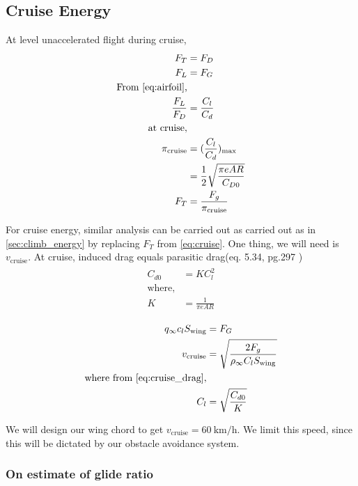 \subsection{Cruise Energy}
At level unaccelerated flight during cruise,
\begin{align}
    \label{eq:cruise}
    \begin{split}
        F_T &= F_D\\
        F_L &= F_G\\
        \text{From \eqref{eq:airfoil},}\\
        \frac{F_L}{F_D} &= \frac{C_l}{C_d}\\
        \text{at cruise},\\
        \pi_\text{cruise} &= (\frac{C_l}{C_d})_\text{max}\\
        &= \frac{1}{2}\sqrt{\frac{\pi e AR}{C_{D0}}}\\
        F_T &= \frac{F_g}{\pi_\text{cruise}}        
    \end{split}
\end{align}

For cruise energy, similar analysis can be carried out as carried out as in \ref{sec:climb_energy} by replacing $F_T$ from \eqref{eq:cruise}. One thing, we will need is $v_\text{cruise}$. At cruise, induced drag equals parasitic drag(eq. 5.34, pg.297 \cite{anderson2005introduction})
\begin{align}
    \begin{split}
        \label{eq:cruise_drag}
        C_{d0} &= K C_l^2 \\
        \text{where,}\\
        K &= \frac{1}{\pi e AR} \\    
    \end{split}
\end{align}
\begin{align*}
    q_\infty c_l S_\text{wing} &= F_G \\
    v_\text{cruise} &= \sqrt{\frac{2F_g}{\rho_\infty C_l S_\text{wing}}}\\
    \text{where from \eqref{eq:cruise_drag},}\\
    C_l &= \sqrt{\frac{C_{d0}}{K}}
\end{align*}

We will design our wing chord to get $v_\text{cruise} = 60~\text{km/h}$. We limit this speed, since this will be dictated by our obstacle avoidance system.

\subsubsection{On estimate of glide ratio}


